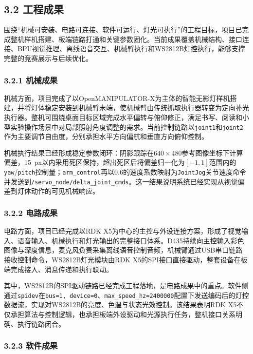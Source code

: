 \documentclass[UTF8,a4paper,zihao=-4]{ctexart}
\begin{document}
\subsection*{3.2 工程成果}

围绕“机械可安装、电路可连接、软件可运行、灯光可执行”的工程目标，项目已完成整机样机搭建、板端链路打通和关键参数固化。当前成果覆盖机械结构、接口连接、BPU视觉推理、离线语音交互、机械臂执行和WS2812B灯控执行，能够支撑完整的竞赛展示与后续优化。

\subsubsection*{3.2.1 机械成果}

机械方面，项目完成了以OpenMANIPULATOR-X为主体的智能无影灯样机搭建，并将灯体稳定安装到机械臂末端，使机械臂由传统抓取执行器转变为定向补光执行器。整机可围绕桌面目标区域完成水平偏转与俯仰修正，满足书写、阅读和小型实验操作场景中对局部照射角度调整的需求。当前控制链路以\texttt{joint1}和\texttt{joint2}作为主要调节自由度，分别承担水平方向偏航和垂直方向俯仰控制。

机械执行结果已经形成稳定参数闭环：阴影跟踪在$640\times480$参考图像坐标下计算偏差，15~px以内采用死区保持，超出死区后将偏差归一化为$[-1,1]$范围内的\texttt{yaw}/\texttt{pitch}控制量；\texttt{arm\_control}再以0.6的速度系数映射为\texttt{JointJog}关节速度命令并发送到\texttt{/servo\_node/delta\_joint\_cmds}。这一结果说明系统已经实现从视觉偏差到灯体动作的可见机械响应。

\subsubsection*{3.2.2 电路成果}

电路方面，项目已经完成以RDK X5为中心的主控与外设连接方案，形成了视觉输入、语音输入、机械执行和灯光输出的完整接口体系。D435持续向主控输入彩色图像与深度信息，麦克风负责采集离线语音控制音频，机械臂通过USB串口链路接收控制命令，WS2812B灯光模块由RDK X5的SPI接口直接驱动，整套设备在板端完成接入、消息传递和执行联动。

其中，WS2812B的SPI驱动链路已经完成工程落地，是电路成果中的重点。软件侧通过\texttt{spidev}在\texttt{bus=1, device=0}、\texttt{max\_speed\_hz=2400000}配置下发送编码后的灯控数据流，实现对WS2812B的亮度、色温与状态光效控制。该结果表明RDK X5不仅承担算法与控制逻辑，也承担板端外设驱动和光源执行任务，整机接口关系明确、执行链路闭合。

\subsubsection*{3.2.3 软件成果}
\end{document}
